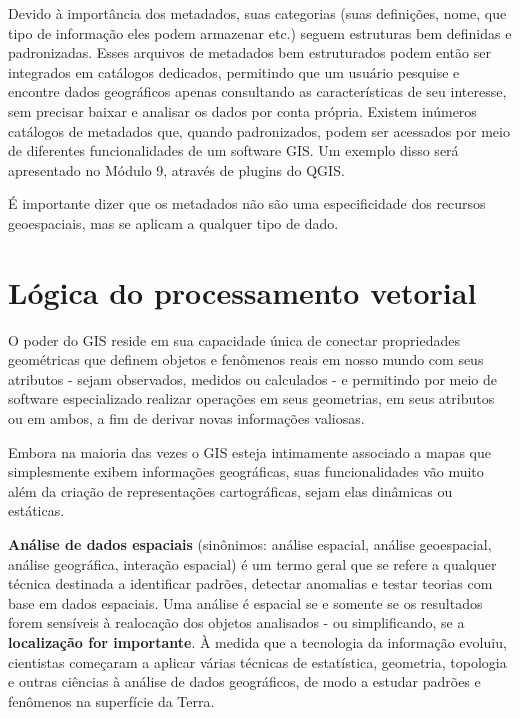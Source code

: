 \documentclass[
]{krantz}
\begin{document}
Devido à importância dos metadados, suas categorias (suas definições, nome, que tipo de informação eles podem armazenar etc.) seguem estruturas bem definidas e padronizadas. Esses arquivos de metadados bem estruturados podem então ser integrados em catálogos dedicados, permitindo que um usuário pesquise e encontre dados geográficos apenas consultando as características de seu interesse, sem precisar baixar e analisar os dados por conta própria. Existem inúmeros catálogos de metadados que, quando padronizados, podem ser acessados \hspace{0pt}\hspace{0pt}por meio de diferentes funcionalidades de um software GIS. Um exemplo disso será apresentado no Módulo 9, através de plugins do QGIS.

É importante dizer que os metadados não são uma especificidade dos recursos geoespaciais, mas se aplicam a qualquer tipo de dado.

\hypertarget{luxf3gica-do-processamento-vetorial}{%
\section{Lógica do processamento vetorial}\label{luxf3gica-do-processamento-vetorial}}

O poder do GIS reside em sua capacidade única de conectar propriedades geométricas que definem objetos e fenômenos reais em nosso mundo com seus atributos - sejam observados, medidos ou calculados - e permitindo por meio de software especializado realizar operações em seus geometrias, em seus atributos ou em ambos, a fim de derivar novas informações valiosas.

Embora na maioria das vezes o GIS esteja intimamente associado a mapas que simplesmente exibem informações geográficas, suas funcionalidades vão muito além da criação de representações cartográficas, sejam elas dinâmicas ou estáticas.

\textbf{Análise de dados espaciais} (sinônimos: análise espacial, análise geoespacial, análise geográfica, interação espacial) é um termo geral que se refere a qualquer técnica destinada a identificar padrões, detectar anomalias e testar teorias com base em dados espaciais. Uma análise é espacial se e somente se os resultados forem sensíveis à realocação dos objetos analisados \hspace{0pt}\hspace{0pt}- ou simplificando, se a \textbf{localização for importante}. À medida que a tecnologia da informação evoluiu, cientistas começaram a aplicar várias técnicas de estatística, geometria, topologia e outras ciências à análise de dados geográficos, de modo a estudar padrões e fenômenos na superfície da Terra.
\end{document}
